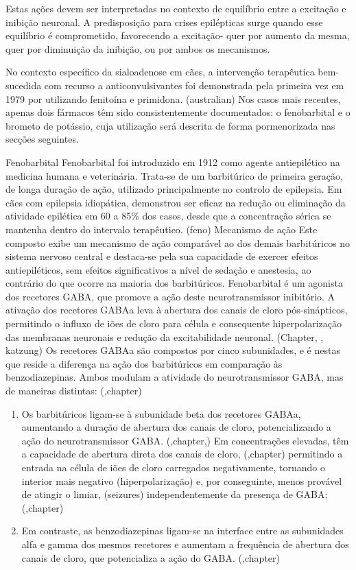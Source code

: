 Estas ações devem ser interpretadas no contexto de equilíbrio entre a excitação e inibição neuronal. A predisposição para crises epilépticas surge quando esse equilíbrio é comprometido, favorecendo a excitação- quer por aumento da mesma, quer por diminuição da inibição, ou por ambos os mecanismos.\cite{katzung}


No contexto específico da sialoadenose em cães, a intervenção terapêutica bem-sucedida com recurso a anticonvulsivantes foi demonstrada pela primeira vez em 1979 por \cite{Kelly2017} utilizando fenitoína e primidona. (australian) Nos casos mais recentes, apenas dois fármacos têm sido consistentemente documentados: o fenobarbital e o brometo de potássio, cuja utilização será descrita de forma pormenorizada nas secções seguintes.


Fenobarbital
Fenobarbital foi introduzido em 1912 como agente antiepilético na medicina humana e veterinária. \cite{Yasiry2012}\cite{Jukier2023} Trata-se de um barbitúrico de primeira geração, de longa duração de ação, utilizado principalmente no controlo de epilepsia. \cite{papich}\cite{Scott2021} Em cães com epilepsia idiopática, demonstrou ser eficaz na redução ou eliminação da atividade epilética em 60 a 85\% dos casos, desde que a concentração sérica se mantenha dentro do intervalo terapêutico. (feno)
Mecanismo de ação 
Este composto exibe um mecanismo de ação comparável ao dos demais barbitúricos no sistema nervoso central e destaca-se pela sua capacidade de exercer efeitos antiepiléticos, sem efeitos significativos a nível de sedação e anestesia, ao contrário do que ocorre na maioria dos barbitúricos. \cite{papich}
 Fenobarbital é um agonista dos recetores GABA, que promove a ação deste neurotransmissor inibitório. A ativação dos recetores GABAa leva à abertura dos canais de cloro pós-sinápticos, permitindo o influxo de iões de cloro para célula e consequente hiperpolarização das membranas neuronais e redução da excitabilidade neuronal. (Chapter, \cite{papich}, katzung) Os recetores GABAa são compostos por cinco subunidades, e é nestas que reside a diferença na ação dos barbitúricos em comparação às benzodiazepinas. Ambos modulam a atividade do neurotransmissor GABA, mas de maneiras distintas: (\cite{Trinka2023},chapter)

 \begin{enumerate}
    \item	Os barbitúricos ligam-se à subunidade beta dos recetores GABAa, aumentando a duração de abertura dos canais de cloro, potencializando a ação do neurotransmissor GABA. (\cite{Trinka2023},chapter,\cite{Bersan2014}) Em concentrações elevadas, têm a capacidade de abertura direta dos canais de cloro, (\cite{Trinka2023},chapter) permitindo a entrada na célula de iões de cloro carregados negativamente, tornando o interior mais negativo (hiperpolarização) e, por conseguinte, menos provável de atingir o limiar, (seizures) independentemente da presença de GABA; (\cite{Trinka2023},chapter)
    \item Em contraste, as benzodiazepinas ligam-se na interface entre as subunidades alfa e gamma dos mesmos recetores e aumentam a frequência de abertura dos canais de cloro, que potencializa a ação do GABA. (\cite{Trinka2023},chapter)
\end{enumerate}

